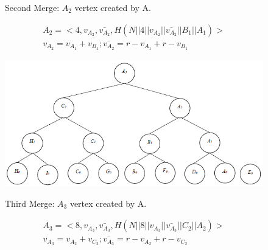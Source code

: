 \begin{exmp}
\begin{figure}[h!]
					\caption{Second Merge: $A_{2}$ vertex created by A.}
					\label{fig:commitment-tree-example-3-shia}
				\end{figure}
				\begin{equation}
					\begin{array}{l}
						A_{2} = <4, v_{A_{2}},\bar{v_{A_{2}}},H(N || 4 || v_{A_{2}} || \bar{v_{A_{2}}} || B_{1} ||A_{1}) >\\
						v_{A_{2}} = v_{A_{1}} + v_{B_{1}}; \bar{v_{A_{2}}} = r - v_{A_{1}} + r - v_{B_{1}}
					\end{array}
				\end{equation}
				\begin{figure}[h!]
					\centering
					\includegraphics[width=6in]{images/commitment-tree-example-4-shia.png}\\
					\caption{Third Merge: $A_{3}$ vertex created by A.}
					\label{fig:commitment-tree-example-4-shia}
				\end{figure}
				\begin{equation}
					\begin{array}{l}
						A_{3} = <8, v_{A_{3}},\bar{v_{A_{3}}},H(N || 8 || v_{A_{3}} || \bar{v_{A_{3}}} || C_{2} ||A_{2}) >\\
						v_{A_{3}} = v_{A_{2}} + v_{C_{2}}; \bar{v_{A_{3}}} = r - v_{A_{2}} + r - v_{C_{2}}
					\end{array}
				\end{equation}
			\end{exmp}

